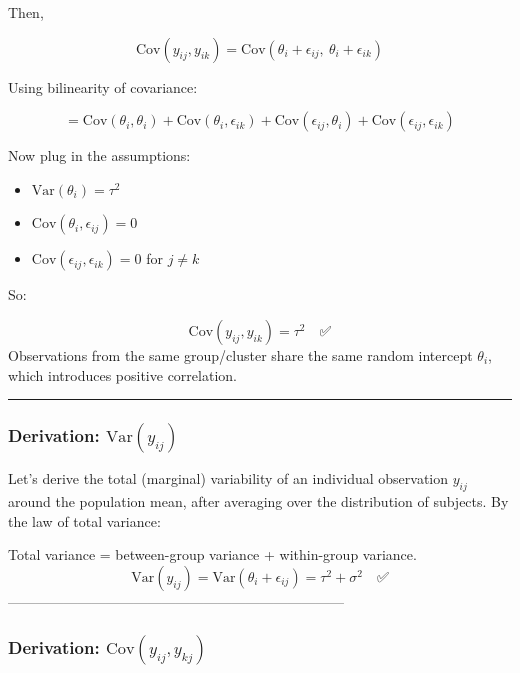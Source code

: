 \documentclass[
  letterpaper,
  DIV=11,
  numbers=noendperiod]{scrreprt}
\providecommand{\tightlist}{%
  \setlength{\itemsep}{0pt}\setlength{\parskip}{0pt}}\usepackage{longtable,booktabs,array}
\begin{document}
Then,

\[
\text{Cov}(y_{ij}, y_{ik}) = \text{Cov}(\theta_i + \epsilon_{ij},\ \theta_i + \epsilon_{ik})
\]

Using bilinearity of covariance:

\[
= \text{Cov}(\theta_i, \theta_i) + \text{Cov}(\theta_i, \epsilon_{ik}) + \text{Cov}(\epsilon_{ij}, \theta_i) + \text{Cov}(\epsilon_{ij}, \epsilon_{ik})
\]

Now plug in the assumptions:

\begin{itemize}
\tightlist
\item
  \(\text{Var}(\theta_i) = \tau^2\)
\item
  \(\text{Cov}(\theta_i, \epsilon_{ij}) = 0\)
\item
  \(\text{Cov}(\epsilon_{ij}, \epsilon_{ik}) = 0\) for \(j \ne k\)
\end{itemize}

So:

\[
 \text{Cov}(y_{ij}, y_{ik}) = \tau^2\quad  ✅ 
\] Observations from the same group/cluster share the same random
intercept \(\theta_i\), which introduces positive correlation.

\begin{center}\rule{0.5\linewidth}{0.5pt}\end{center}

\hypertarget{derivation-textvary_ij}{%
\subsubsection*{\texorpdfstring{Derivation:
\(\text{Var}(y_{ij})\)}{Derivation: \textbackslash text\{Var\}(y\_\{ij\})}}\label{derivation-textvary_ij}}

Let's derive the total (marginal) variability of an individual
observation \(y_{ij}\) around the population mean, after averaging over
the distribution of subjects. By the law of total variance:

Total variance = between-group variance + within-group variance. \[
\text{Var}(y_{ij}) = \text{Var}(\theta_i + \epsilon_{ij}) = \tau^2 + \sigma^2\quad ✅ 
\]
------------------------------------------------------------------------

\hypertarget{derivation-textcovy_ij-y_kj}{%
\subsubsection*{\texorpdfstring{Derivation:
\(\text{Cov}(y_{ij}, y_{kj})\)}{Derivation: \textbackslash text\{Cov\}(y\_\{ij\}, y\_\{kj\})}}\label{derivation-textcovy_ij-y_kj}}
\end{document}
